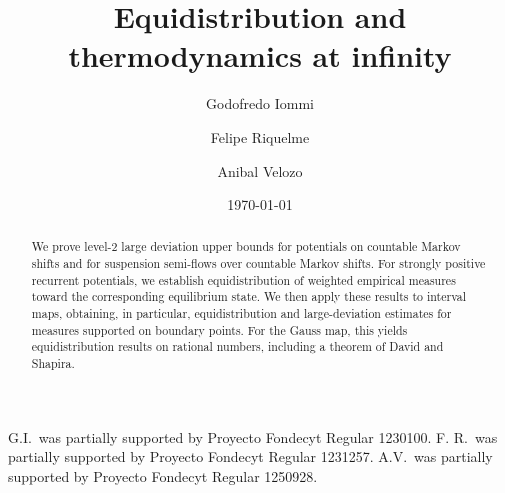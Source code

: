 \documentclass[letterpaper,11pt]{amsart}
\numberwithin{equation}{section}     %
\begin{document}
	
	

\title{Equidistribution and thermodynamics at infinity}

\date{\today}




\begin{thanks}
{G.I.\ was partially supported by Proyecto Fondecyt Regular 1230100. F. R.\ was partially supported by Proyecto Fondecyt Regular 1231257. A.V.\ was partially supported  by Proyecto Fondecyt Regular  1250928.}
\end{thanks}



\author[G.~Iommi]{Godofredo Iommi}
\address{Facultad de Matem\'aticas,
Pontificia Universidad Cat\'olica de Chile (UC), Avenida Vicu\~na Mackenna 4860, Santiago, Chile}


 \author[F.~Riquelme]{Felipe Riquelme}  \address{Instituto de Matem\'aticas, Pontificia Universidad Cat\'olica de Valpara\'iso (PUCV), Blanco Viel 596, Valpara\'iso, Chile}


 \author[A.~Velozo]{Anibal Velozo}  \address{Facultad de Matem\'aticas,
Pontificia Universidad Cat\'olica de Chile (UC), Avenida Vicu\~na Mackenna 4860, Santiago, Chile}









\begin{abstract} We prove level-2 large deviation upper bounds for potentials on countable Markov shifts and for suspension semi-flows over countable Markov shifts. For strongly positive recurrent potentials, we establish equidistribution of weighted empirical measures toward the corresponding equilibrium state. We then apply these results to interval maps, obtaining, in particular, equidistribution  and large-deviation estimates for measures supported on boundary points. For the Gauss map, this yields equidistribution results on rational numbers, including a theorem of David and Shapira.



\end{abstract}
\end{document}

